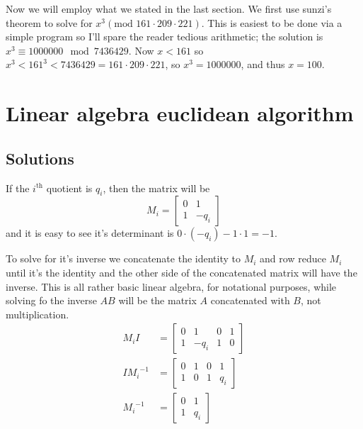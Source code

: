\documentclass{article}
\begin{document}
	 Now we will employ what we stated in the last section. We first use sunzi's theorem to solve for $x^3 (\text{mod }161\cdot209\cdot221)$. This is easiest to be done via a simple program so I'll spare the reader tedious arithmetic; the solution is $x^3 \equiv 1000000 \mod 7436429$. Now $x < 161$ so $x^3 < 161^3 < 7436429 = 161 \cdot 209 \cdot 221$, so $x^3 = 1000000$, and thus $x = 100$.
	
	\section{Linear algebra euclidean algorithm}
	
	\subsection{Solutions}
	
	 If the $i^{\text{th}}$ quotient is $q_i$, then the matrix will be $$M_i = \left[\begin{matrix}0&1\\1&-q_i\end{matrix}\right]$$ and it is easy to see it's determinant is $0\cdot(-q_i) - 1\cdot 1 = -1$.
	
	To solve for it's inverse we concatenate the identity to $M_i$ and row reduce $M_i$ until it's the identity and the other side of the concatenated matrix will have the inverse. This is all rather basic linear algebra, for notational purposes, while solving fo the inverse $AB$ will be the matrix $A$ concatenated with $B$, not multiplication.
	\begin{align*}
	M_iI &= 
	\left[\begin{matrix}
	0&1&0&1\\
	1&-q_i&1&0
	\end{matrix}\right] \\
	I{M_i}^{-1}&=
	\left[\begin{matrix}
	0&1&0&1\\
	1&0&1&q_i
	\end{matrix}\right] \\
	{M_i}^{-1} &=
	\left[\begin{matrix}
	0&1\\
	1&q_i
	\end{matrix}\right]
	\end{align*}
	
\end{document}
